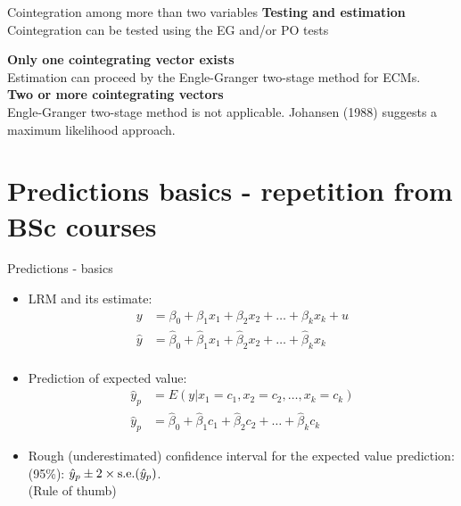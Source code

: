 \documentclass{beamer}
\begin{document}

\begin{frame}{Cointegration among more than two variables}
\textbf{Testing and estimation}\\
Cointegration can be tested using the EG and/or PO tests

\hspace{0.3cm}

\textbf{Only one cointegrating vector exists}\\
Estimation can proceed by the Engle-Granger two-stage method for ECMs. \\ 
\vspace{0.3cm}
\textbf{Two or more cointegrating vectors}\\
Engle-Granger two-stage method is not applicable. Johansen (1988) suggests a maximum likelihood approach. 
\end{frame}


\section{Predictions basics - repetition from BSc courses}

\begin{frame}{Predictions - basics}
\begin{itemize}
\item LRM and its estimate:
\begin{align}\nonumber
y & = \beta_0 + \beta_1 x_1 +\beta_2 x_2 + \dots + \beta_k x_k + u\\ \nonumber
\hat{y} & = \hat{\beta}_0 + \hat{\beta}_1 x_1 +\hat{\beta}_2 x_2 + \dots + \hat{\beta}_k x_k \\ \nonumber
\end{align}
\item Prediction of expected value: 
\begin{align}\nonumber
\hat{y}_p & = E(y|x_1 = c_1, x_2 = c_2,\dots,x_k = c_k)\\ \nonumber
\hat{y}_p & = \hat{\beta}_0 + \hat{\beta}_1 c_1 +\hat{\beta}_2 c_2 + \dots + \hat{\beta}_k c_k  \nonumber
\end{align}
\item Rough (underestimated) confidence interval for the expected value prediction: (95\%): $\hat{y}_p \pm 2 \times \textnormal{s.e.}(\hat{y}_p)$. \\ (Rule of thumb) 
\end{itemize}
\end{frame}
\end{document}
